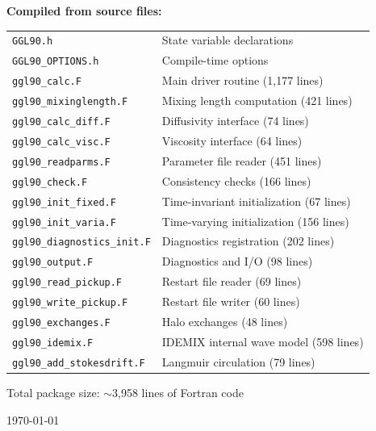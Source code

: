 \documentclass[12pt,letterpaper]{article}
\begin{document}
\begin{titlepage}
\begin{center}
{\large\textbf{Compiled from source files:}}\\[6pt]
\begin{tabular}{ll}
\texttt{GGL90.h}                      & State variable declarations \\
\texttt{GGL90\_OPTIONS.h}              & Compile-time options \\
\texttt{ggl90\_calc.F}                 & Main driver routine (1,177 lines) \\
\texttt{ggl90\_mixinglength.F}         & Mixing length computation (421 lines) \\
\texttt{ggl90\_calc\_diff.F}           & Diffusivity interface (74 lines) \\
\texttt{ggl90\_calc\_visc.F}           & Viscosity interface (64 lines) \\
\texttt{ggl90\_readparms.F}            & Parameter file reader (451 lines) \\
\texttt{ggl90\_check.F}                & Consistency checks (166 lines) \\
\texttt{ggl90\_init\_fixed.F}          & Time-invariant initialization (67 lines) \\
\texttt{ggl90\_init\_varia.F}          & Time-varying initialization (156 lines) \\
\texttt{ggl90\_diagnostics\_init.F}    & Diagnostics registration (202 lines) \\
\texttt{ggl90\_output.F}               & Diagnostics and I/O (98 lines) \\
\texttt{ggl90\_read\_pickup.F}         & Restart file reader (69 lines) \\
\texttt{ggl90\_write\_pickup.F}        & Restart file writer (60 lines) \\
\texttt{ggl90\_exchanges.F}            & Halo exchanges (48 lines) \\
\texttt{ggl90\_idemix.F}               & IDEMIX internal wave model (598 lines) \\
\texttt{ggl90\_add\_stokesdrift.F}     & Langmuir circulation (79 lines) \\
\end{tabular}

\vspace{0.5cm}
{\small\color{gray} Total package size: $\sim$3,958 lines of Fortran code}

\vfill
{\color{gray}\today}
\end{center}
\end{titlepage}

\tableofcontents
\newpage
\end{document}
